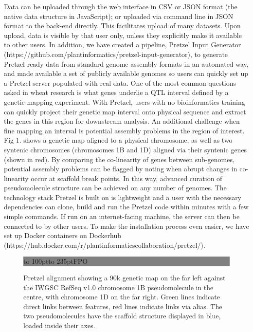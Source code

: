 \documentclass{bioinfo}
\begin{document}
\begin{methods}
Data can be uploaded through the web interface in CSV or JSON format (the native data structure in JavaScript); or uploaded via command line in JSON format to the back-end directly. 
This facilitates upload of many datasets. 
Upon upload, data is visible by that user only, unless they explicitly make it available to other users. 
In addition, we have created a pipeline, Pretzel Input Generator (https://github.com/plantinformatics/pretzel-input-generator), to generate Pretzel-ready data from standard genome assembly formats in an automated way, and made available a set of publicly available genomes so users can quickly set up a Pretzel server populated with real data.
One of the most common questions asked in wheat research is what genes underlie a QTL interval defined by a genetic mapping experiment. 
With Pretzel, users with no bioinformatics training can quickly project their genetic map interval onto physical sequence and extract the genes in this region for downstream analysis. 
An additional challenge when fine mapping an interval is potential assembly problems in the region of interest. Fig 1. shows a genetic map aligned to a physical chromosome, as well as two syntenic chromosomes (chromosomes 1B and 1D) aligned via their syntenic genes (shown in red). 
By comparing the co-linearity of genes between sub-genomes, potential assembly problems can be flagged by noting when abrupt changes in co-linearity occur at scaffold break points. 
In this way, advanced curation of pseudomolecule structure can be achieved on any number of genomes.
The technology stack Pretzel is built on is lightweight and a user with the necessary dependencies can clone, build and run the Pretzel code within minutes with a few simple commands. 
If run on an internet-facing machine, the server can then be connected to by other users. 
To make the installation process even easier, we have set up Docker containers on Dockerhub (https://hub.docker.com/r/plantinformaticscollaboration/pretzel/).



\end{methods}

\begin{figure}[!tpb]%
\fboxsep=0pt\colorbox{gray}{\begin{minipage}[t]{235pt} \vbox to 100pt{\vfill\hbox to
235pt{\hfill\fontsize{24pt}{24pt}\selectfont FPO\hfill}\vfill}
\end{minipage}}
\caption{
  Pretzel alignment showing a 90k genetic map on the far left against the IWGSC RefSeq v1.0 chromosome 1B pseudomolecule in the centre, 
  with chromosome 1D on the far right. 
  Green lines indicate direct links between features, red lines indicate links via alias. 
  The two pseudomolecules have the scaffold structure displayed in blue, loaded inside their axes.
}
\label{fig:01}
\end{figure}
\end{document}
